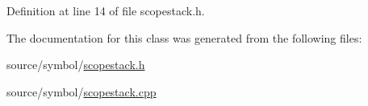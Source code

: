 Definition at line 14 of file scopestack.h.



The documentation for this class was generated from the following files:\begin{DoxyCompactItemize}
\item 
source/symbol/\hyperlink{scopestack_8h}{scopestack.h}\item 
source/symbol/\hyperlink{scopestack_8cpp}{scopestack.cpp}\end{DoxyCompactItemize}
